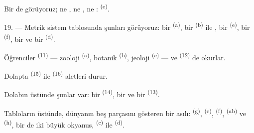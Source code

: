 Bir de  görüyoruz; ne , ne
, ne : 
\textsuperscript{(e)}.

19. --- Metrik sistem tablosunda şunları görüyoruz: bir 
\textsuperscript{(a)}, bir  \textsuperscript{(b)} ile
, bir  \textsuperscript{(e)}, bir
 \textsuperscript{(f)}, bir  ve bir
 \textsuperscript{(d)}.

Öğrenciler  \textsuperscript{(11)} --- zooloji
\textsuperscript{(a)}, botanik \textsuperscript{(b)}, jeoloji
\textsuperscript{(c)} --- ve  \textsuperscript{(12)} de okurlar.

Dolapta  \textsuperscript{(15)} ile 
\textsuperscript{(16)} aletleri durur.

Dolabın üstünde şunlar var: bir  \textsuperscript{(14)}, bir
 ve bir  \textsuperscript{(13)}.

Tabloların üstünde, dünyanın beş parçasını gösteren bir 
asılı:  \textsuperscript{(g)}, 
\textsuperscript{(e)},  \textsuperscript{(f)},
 \textsuperscript{(ab)} ve 
\textsuperscript{(h)}, bir de iki büyük okyanus, 
\textsuperscript{(c)} ile  \textsuperscript{(d)}.
\VUsaut{6.0mm}
\VUfilet{22mm}
